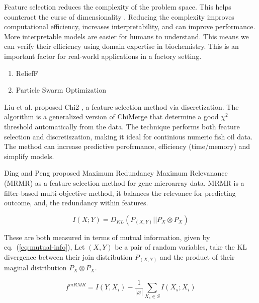\documentclass[runningheads]{llncs}
\begin{document}
Feature selection reduces the complexity of the problem space.
This helps counteract the curse of dimensionality \cite{koppen2000curse}.
Reducing the complexity improves computational efficiency, increases interpretability, and can improve performance.
More interpretable models are easier for humans to understand.
This means we can verify their efficiency using domain expertise in biochemistry.
This is an important factor for real-world applications in a factory setting.

\begin{enumerate}
  \item ReliefF \cite{robnik2003theoretical}
  \item Particle Swarm Optimization \cite{kennedy1995particle,kennedy1997discrete}
\end{enumerate}

Liu et al. proposed Chi2 \cite{liu1995chi2}, a feature selection method via discretization. 
The algorithm is a generalized version of ChiMerge \cite{kerber1992chimerge} that determine a good $\chi^2$ threshold automatically from the data.
The technique performs both feature selection and discretiszation, making it ideal for continious numeric fish oil data. 
The method can increase predictive perofrmance, efficiency (time/memory) and simplify models. 

Ding and Peng \cite{ding2005minimum} proposed Maximum Redundancy Maximum Relevanance (MRMR) as a feature selection method for gene microarray data. 
MRMR is a filter-based multi-objective method, it balances the relevance for predicting outcome, and, the redundancy within features.

\begin{equation}
  I(X;Y) = D_{KL}(P_{(X,Y)} || P_X \otimes P_X) \label{eq:mutual-info}
\end{equation}  

These are both measured in terms of mutual information, given by eq.~(\ref{eq:mutual-info}), 
Let $(X,Y)$ be a pair of random variables, take the KL divergence between their join distribution $P_{(X,Y)}$ and the product of their maginal distribution $P_X \otimes P_X$.

\begin{equation}
  f^{mRMR} = I(Y,X_i) - \frac{1}{|x|} \sum_{X_s \in S} I(X_s;X_i) \label{eq:mrmr}
\end{equation}  
\end{document}
